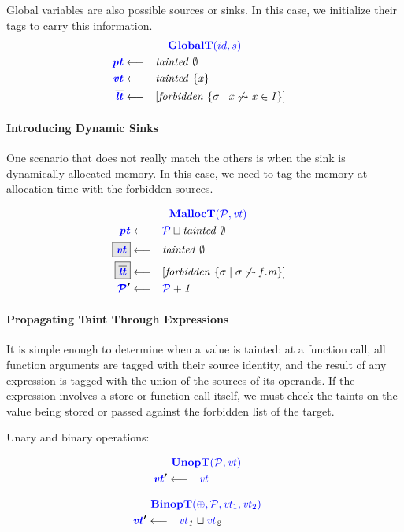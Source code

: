\documentclass[acmsmall,review,anonymous]{acmart}\settopmatter{printfolios=true,printccs=false,printacmref=false}
\begin{document}
Global variables are also possible sources or sinks. In this case, we initialize their
tags to carry this information.
\[\begin{aligned}
\truledef{\globalt}
\settag{\pt}{\mathit{tainted} ~ \emptyset}
\settag{\vt}{\mathit{tainted} ~ \{x\}}
\settag{\overline{\lt}}{\left[\mathit{forbidden} ~ \{\sigma \mid x \not \rightsquigarrow x \in I\}\right]}
\end{aligned}\]

\paragraph{Introducing Dynamic Sinks}

One scenario that does not really match the others is when the sink is dynamically allocated
memory. In this case, we need to tag the memory at allocation-time with the forbidden
sources.

\[\begin{aligned}
\truledef{\malloct}
\settag{\pt}{\PCT \sqcup \mathit{tainted} ~ \emptyset}
\settagopt{\vt}{\mathit{tainted} ~ \emptyset}
\settagopt{\overline{\lt}}{\left[\mathit{forbidden} ~ \{\sigma \mid \sigma \not \rightsquigarrow f.m\} \right]}
\settag{\PCT'}{\PCT + 1}
\end{aligned}\]

\paragraph{Propagating Taint Through Expressions}

It is simple enough to determine when a value is tainted: at a function
call, all function arguments are tagged with their source identity, and the result
of any expression is tagged with the union of the sources of its operands. If the
expression involves a store or function call itself, we must check the taints on
the value being stored or passed against the forbidden list of the target.

Unary and binary operations:

\begin{minipage}[t]{.49\textwidth}
  \[\begin{aligned}
  \truledef{\unopt}
  \settag{\vt'}{\vt}
  \end{aligned}\]
\end{minipage}
\begin{minipage}[t]{.49\textwidth}
  \[\begin{aligned}
  \truledef{\binopt}
  \settag{\vt'}{
    \vt_1 \sqcup \vt_2
  }
  \end{aligned}\]
\end{minipage}
\end{document}
